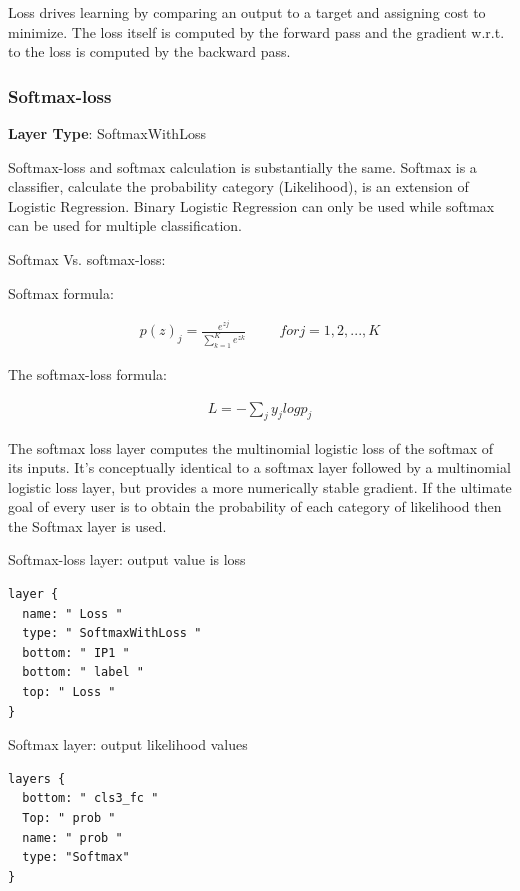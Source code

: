 \documentclass[12pt]{article}
\begin{document}
Loss drives learning by comparing an output to a target and assigning cost to minimize. The loss itself is computed by the forward pass and the gradient w.r.t. to the loss is computed by the backward pass.

\subsubsection{Softmax-loss}

\noindent \textbf{Layer Type}: SoftmaxWithLoss

Softmax-loss and softmax calculation is substantially the same. Softmax is a classifier, calculate the probability category (Likelihood), is an extension of Logistic Regression. Binary Logistic Regression can only be used while softmax can be used for multiple classification.

\noindent Softmax Vs. softmax-loss:

\noindent Softmax formula:

\begin{gather}
p(z)_{j} = \frac{e^{zj}}{\sum_{k=1}^{K}e^{zk}}   \hspace{1cm} for j= 1,2,...,K
\end{gather}

\noindent The softmax-loss formula:

\begin{gather}
L = -\sum_{j} y_{j}log p_{j}
\end{gather}

The softmax loss layer computes the multinomial logistic loss of the softmax of its inputs. It's conceptually identical to a softmax layer followed by a multinomial logistic loss layer, but provides a more numerically stable gradient. If the ultimate goal of every user is to obtain the probability of each category of likelihood then the Softmax layer is used.

\noindent Softmax-loss layer: output value is loss

\begin{lstlisting}[style=json, frame=single]
layer {
  name: " Loss "
  type: " SoftmaxWithLoss "
  bottom: " IP1 "
  bottom: " label "
  top: " Loss "
}
\end{lstlisting}

\noindent Softmax layer: output likelihood values

\begin{lstlisting}[style=json, frame=single]
layers {
  bottom: " cls3_fc "
  Top: " prob "
  name: " prob "
  type: "Softmax"
}
\end{lstlisting}
\end{document}
